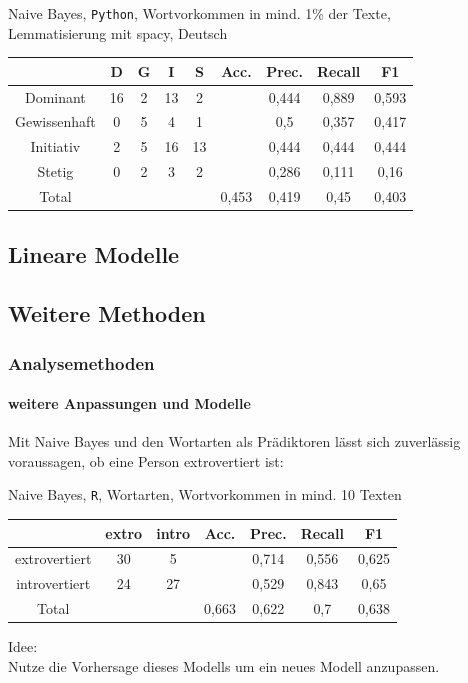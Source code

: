 \documentclass{beamer}
\begin{document}
\begin{frame}
\begin{center}
Naive Bayes, \texttt{Python}, Wortvorkommen in mind. 1\% der Texte,\\
Lemmatisierung mit spacy, Deutsch\
\begin{tabular}{|c|c|c|c|c|c|c|c|c|}
\hline
 & D 	& G	& I & S	& Acc.	& Prec. & Recall	& F1\\
\hline
Dominant & 16 & 2 & 13 & 2 & & 0,444 & 0,889 & 0,593\\
Gewissenhaft & 0 & 5 & 4 & 1 & & 0,5 & 0,357 & 0,417\\
Initiativ & 2 & 5 & 16 & 13& & 0,444 & 0,444 & 0,444\\
Stetig & 0 & 2 & 3 & 2& & 0,286 & 0,111 & 0,16 \\
\hline
Total  &   &   &   &   & 0,453 & 0,419  & 0,45   & 0,403\\
\hline
\end{tabular}
\end{center}
\end{frame}

\subsection{Lineare Modelle}

\subsection{Weitere Methoden}
\begin{frame}
 \frametitle{Analysemethoden}
 \framesubtitle{weitere Anpassungen und Modelle}
 Mit Naive Bayes und den Wortarten als Prädiktoren lässt sich zuverlässig voraussagen,
 ob eine Person extrovertiert ist:\\
 \vspace{12pt}
 \begin{center} 
 Naive Bayes, \texttt{R}, Wortarten, Wortvorkommen in mind. 10 Texten
  \begin{tabular}{c|c|c|c|c|c|c|}
                & extro & intro & Acc.  & Prec. & Recall    & F1 \\
  \hline
  extrovertiert & 30    & 5     &       & 0,714 & 0,556     & 0,625 \\
  introvertiert & 24    & 27    &       & 0,529 & 0,843     & 0,65 \\
  \hline
  Total         &       &       & 0,663 & 0,622 & 0,7       & 0,638 \\
  \hline
 \end{tabular}
 
 \end{center}

 \vspace{12pt}
 
 Idee:\\
 Nutze die Vorhersage dieses Modells um ein neues Modell anzupassen.
\end{frame}
\end{document}
